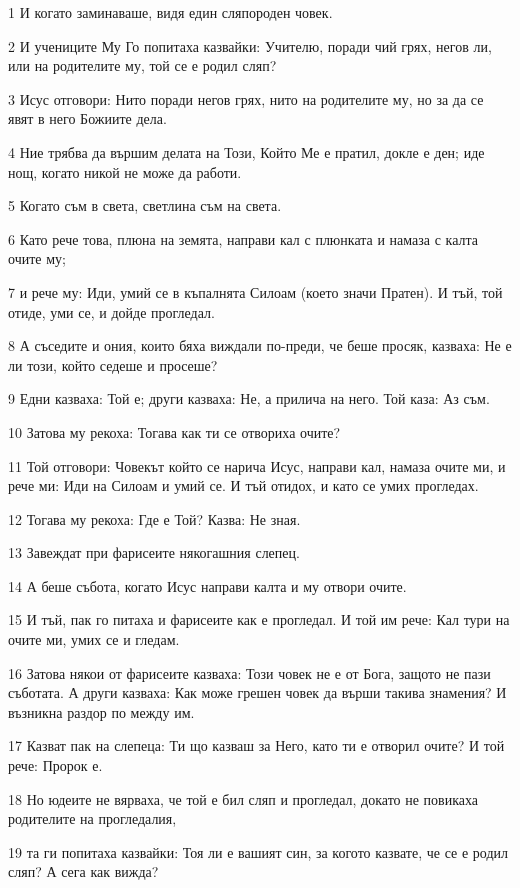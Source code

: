 \par 1 И когато заминаваше, видя един сляпороден човек.
\par 2 И учениците Му Го попитаха казвайки: Учителю, поради чий грях, негов ли, или на родителите му, той се е родил сляп?
\par 3 Исус отговори: Нито поради негов грях, нито на родителите му, но за да се явят в него Божиите дела.
\par 4 Ние трябва да вършим делата на Този, Който Ме е пратил, докле е ден; иде нощ, когато никой не може да работи.
\par 5 Когато съм в света, светлина съм на света.
\par 6 Като рече това, плюна на земята, направи кал с плюнката и намаза с калта очите му;
\par 7 и рече му: Иди, умий се в къпалнята Силоам (което значи Пратен). И тъй, той отиде, уми се, и дойде прогледал.
\par 8 А съседите и ония, които бяха виждали по-преди, че беше просяк, казваха: Не е ли този, който седеше и просеше?
\par 9 Едни казваха: Той е; други казваха: Не, а прилича на него. Той каза: Аз съм.
\par 10 Затова му рекоха: Тогава как ти се отвориха очите?
\par 11 Той отговори: Човекът който се нарича Исус, направи кал, намаза очите ми, и рече ми: Иди на Силоам и умий се. И тъй отидох, и като се умих прогледах.
\par 12 Тогава му рекоха: Где е Той? Казва: Не зная.
\par 13 Завеждат при фарисеите някогашния слепец.
\par 14 А беше събота, когато Исус направи калта и му отвори очите.
\par 15 И тъй, пак го питаха и фарисеите как е прогледал. И той им рече: Кал тури на очите ми, умих се и гледам.
\par 16 Затова някои от фарисеите казваха: Този човек не е от Бога, защото не пази съботата. А други казваха: Как може грешен човек да върши такива знамения? И възникна раздор по между им.
\par 17 Казват пак на слепеца: Ти що казваш за Него, като ти е отворил очите? И той рече: Пророк е.
\par 18 Но юдеите не вярваха, че той е бил сляп и прогледал, докато не повикаха родителите на прогледалия,
\par 19 та ги попитаха казвайки: Тоя ли е вашият син, за когото казвате, че се е родил сляп? А сега как вижда?
